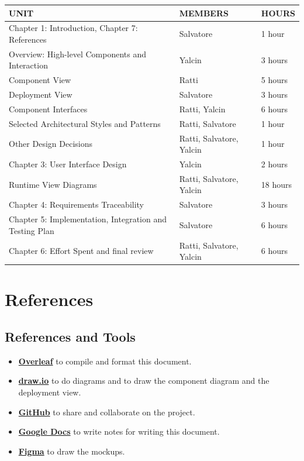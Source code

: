 \documentclass[a4paper,12pt]{article}
\begin{document}
\begin{center}
    \begin{tabular}{|m{5cm}|m{5cm}|m{2cm}|}
        \hline
        \textbf{UNIT} & \textbf{MEMBERS} & \textbf{HOURS} \\ \hline
        Chapter 1: Introduction, Chapter 7: References & Salvatore & 1 hour\\ \hline
        Overview: High-level Components and Interaction & Yalcin & 3 hours\\ \hline
        Component View & Ratti & 5 hours\\ \hline
        Deployment View & Salvatore & 3 hours\\ \hline
        Component Interfaces & Ratti, Yalcin & 6 hours\\ \hline
        Selected Architectural Styles and Patterns & Ratti, Salvatore & 1 hour\\ \hline
        Other Design Decisions & Ratti, Salvatore, Yalcin & 1 hour\\ \hline
        Chapter 3: User Interface Design & Yalcin & 2 hours\\ \hline
        Runtime View Diagrams & Ratti, Salvatore, Yalcin & 18 hours \\ \hline
        Chapter 4: Requirements Traceability & Salvatore & 3 hours \\ \hline
        Chapter 5: Implementation, Integration and Testing Plan  & Salvatore & 6 hours\\ \hline
        Chapter 6: Effort Spent and final review & Ratti, Salvatore, Yalcin & 6 hours\\ \hline
    \end{tabular}
\end{center}
\newpage

\section{References}
\subsection{References and Tools}
\begin{itemize}
    \item \textbf{\href{https://www.overleaf.com/}{Overleaf}} to compile and format this document.
    \item \textbf{\href{https://www.draw.io}{draw.io}} to do diagrams and to draw the component diagram and the deployment view.
    \item \textbf{\href{https://github.com}{GitHub}} to share and collaborate on the project.
    \item \textbf{\href{https://docs.google.com}{Google Docs}} to write notes for writing this document.
    \item \textbf{\href{https://www.figma.com}{Figma}} to draw the mockups.
\end{itemize}
\end{document}
